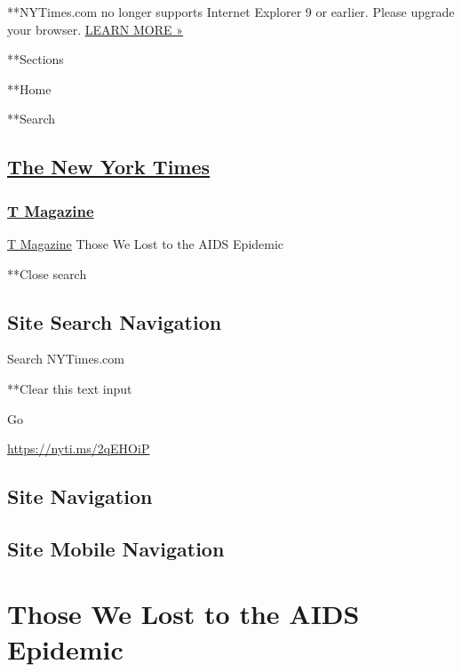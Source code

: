 **NYTimes.com no longer supports Internet Explorer 9 or earlier. Please
upgrade your browser.
\href{http://www.nytimes.com/content/help/site/ie9-support.html}{LEARN
MORE »}

**Sections

**Home

**Search

\hypertarget{the-new-york-times}{%
\subsection{\texorpdfstring{\href{http://www.nytimes.com/}{The New York
Times}}{The New York Times}}\label{the-new-york-times}}

\hypertarget{-t-magazine-}{%
\subsubsection{\texorpdfstring{
\href{https://www.nytimes.com/section/t-magazine}{T Magazine}
}{ T Magazine }}\label{-t-magazine-}}

\href{https://www.nytimes.com/section/t-magazine}{T Magazine}
\textbar{}Those We Lost to the AIDS Epidemic

**Close search

\hypertarget{site-search-navigation}{%
\subsection{Site Search Navigation}\label{site-search-navigation}}

Search NYTimes.com

**Clear this text input

Go

\href{https://nyti.ms/2qEHOiP}{https://nyti.ms/2qEHOiP}

\hypertarget{site-navigation}{%
\subsection{Site Navigation}\label{site-navigation}}

\hypertarget{site-mobile-navigation}{%
\subsection{Site Mobile Navigation}\label{site-mobile-navigation}}

\hypertarget{those-we-lost-to-the-aids-epidemic}{%
\section{Those We Lost to the AIDS
Epidemic}\label{those-we-lost-to-the-aids-epidemic}}

